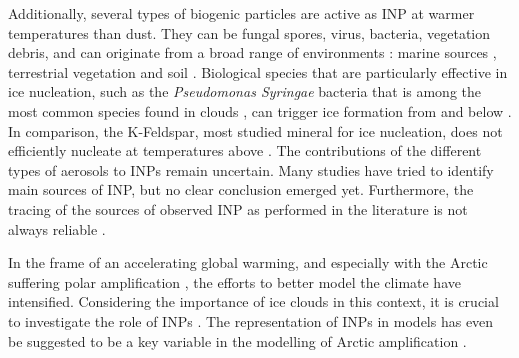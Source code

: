 Additionally, several types of biogenic particles are active as INP at warmer temperatures than dust.
They can be fungal spores, virus, bacteria, vegetation debris, and can originate from a broad range of environments \citep{despres_primary_2012}: marine sources \citep[][]{demott_sea_2016, creamean_ice_2019, irish_ice_2019, ickes_ice-nucleating_2020, kojoj_arctic_2024}, terrestrial vegetation \citep[][]{pereira_freitas_regionally_2023} and soil \citep[][]{creamean_thawing_2020, jensen_linking_2025}. 
Biological species that are particularly effective in ice nucleation, such as the \textit{Pseudomonas Syringae} bacteria that is among the most common species found in clouds \citep{vaitilingom_long-term_2012}, can trigger ice formation from  \citep{maki_ice_1974, amato_survival_2015} and below  \citep{vogel_ice-nucleating_2024}. In comparison, the K-Feldspar, most studied mineral for ice nucleation, does not efficiently nucleate at temperatures above  \citep{connolly_studies_2009, ansmann_influence_2008}.
The contributions of the different types of aerosols to INPs remain uncertain. Many studies have tried to identify main sources of INP, but no clear conclusion emerged yet.
Furthermore, the tracing of the sources of observed INP as performed in the literature is not always reliable \citep[][]{da_silva_how_2025}.
    
    In the frame of an accelerating global warming, and especially with the Arctic suffering polar amplification \citep{serreze_processes_2011, rantanen_arctic_2022, taylor_process_2022}, the efforts to better model the climate have intensified.
    Considering the importance of ice clouds in this context, it is crucial to investigate the role of INPs  \citep{murray_opinion_2021}.
    The representation of INPs in models has even be suggested to be a key variable in the modelling of Arctic amplification \citep[][]{tan_potential_2022}.
    
